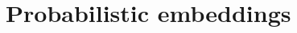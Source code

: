 \documentclass{report}
\begin{document}

\section{Probabilistic embeddings}

 
 
 
 
\end{document}
